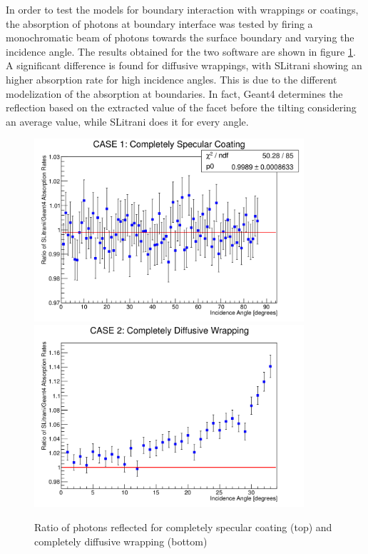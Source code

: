 In order to test the models for boundary interaction with wrappings or coatings, the absorption of photons at boundary interface was tested by firing a monochromatic beam of photons towards the surface boundary and varying the incidence angle. The results obtained for the two software are shown in figure \ref{fig:surface}.
A significant difference is found for diffusive wrappings, with SLitrani showing an higher absorption rate for high incidence angles. This is due to the different modelization of the absorption  at boundaries. In fact, Geant4 determines the reflection based on the extracted value of the facet before the tilting considering an average value, while SLitrani does it for every angle.
\begin{figure}[htbp]
\begin{center}
\includegraphics[width=10cm]{../Pictures/Chapter_5/specular.png}
\includegraphics[width=10cm]{../Pictures/Chapter_5/diffusive.png}
\end{center}
\caption[Geant4 SLitrani specular and diffusive reflection]{Ratio of photons reflected for completely specular coating (top) and completely diffusive wrapping (bottom)}
\label{fig:surface}
\end{figure}

